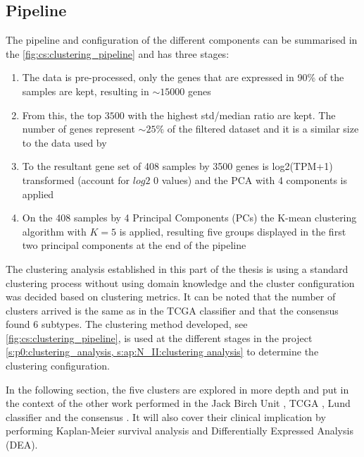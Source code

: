 \subsection{Pipeline}

The pipeline and configuration of the different components can be summarised in the \cref{fig:cs:clustering_pipeline} and has three stages:
\begin{enumerate}
    \item The data is pre-processed, only the genes that are expressed in 90\% of the samples are kept, resulting in $\sim15000$ genes
    \item From this, the top $3500$ with the highest std/median ratio are kept. The number of genes represent $\sim25\%$ of the filtered dataset and it is a similar size to the data used by \citet{Robertson2017-mg}
    \item To the resultant gene set of 408 samples by 3500 genes is log2(TPM+1) transformed (account for $log2$ 0 values) and the PCA with 4 components is applied
    \item On the 408 samples by 4 Principal Components (PCs) the K-mean clustering algorithm with $K=5$ is applied, resulting  five groups displayed in the first two principal components at the end of the pipeline
\end{enumerate}

The clustering analysis established in this part of the thesis is using a standard clustering process without using domain knowledge and the cluster configuration was decided based on clustering metrics. It can be noted that the number of clusters arrived is the same as in the TCGA classifier \citet{Robertson2017-mg} and that the consensus \citet{Kamoun2020-tj} found 6 subtypes. The clustering method developed, see \cref{fig:cs:clustering_pipeline}, is used at the different stages in the project \cref{s:p0:clustering_analysis, s:ap:N_II:clustering analysis} to determine the clustering configuration.

In the following section, the five clusters are explored in more depth and put in the context of the other work performed in the Jack Birch Unit \citet{Baker2022-bj}, TCGA \citet{Robertson2017-mg}, Lund classifier \citet{Marzouka2018-ge} and the consensus \citet{Kamoun2020-tj}. It will also cover their clinical implication by performing Kaplan-Meier survival analysis and Differentially Expressed Analysis (DEA).

